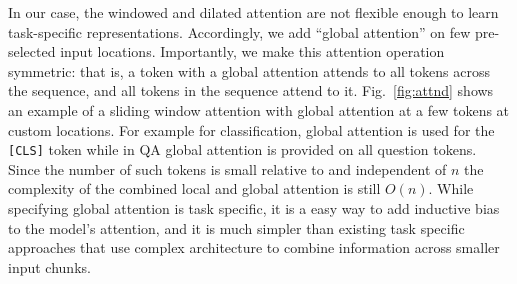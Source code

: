 
In our case, the windowed and dilated attention are not flexible enough to learn task-specific representations.
Accordingly, we add ``global attention'' on few pre-selected input locations.
Importantly, we make this attention operation symmetric: that is, a token
with a global attention attends to all tokens across the sequence, and all tokens in the sequence attend to it. 
Fig.~\ref{fig:attnd} shows an example of a sliding window attention
with global attention at a few tokens at custom locations. For example for classification, global attention is used for the \texttt{[CLS]} token while in QA global attention is provided on all question tokens.
Since the number of such tokens is small relative to and independent of $n$
the complexity of the combined local and global attention is still $O(n)$.
While specifying global attention is task specific, it is a easy way to add inductive bias to the model's attention, and it is much simpler than existing task specific approaches that use complex architecture to combine information across smaller input chunks.



